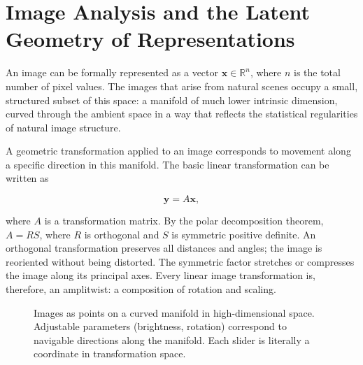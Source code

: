 \documentclass[11pt, a4paper]{article}
\theoremstyle{plain}
\theoremstyle{definition}
\theoremstyle{remark}
\begin{document}
\section{Image Analysis and the Latent Geometry of Representations}

An image can be formally represented as a vector $\mathbf{x} \in \mathbb{R}^n$,
where $n$ is the total number of pixel values. The images that arise from natural
scenes occupy a small, structured subset of this space: a manifold of much lower
intrinsic dimension, curved through the ambient space in a way that reflects
the statistical regularities of natural image structure.

A geometric transformation applied to an image corresponds to movement along a specific
direction in this manifold. The basic linear transformation can be written as

\begin{equation}
\mathbf{y} = A\mathbf{x},
\label{eq:linear_transform}
\end{equation}

where $A$ is a transformation matrix. By the polar decomposition theorem, $A = RS$,
where $R$ is orthogonal and $S$ is symmetric positive definite. An orthogonal
transformation preserves all distances and angles; the image is reoriented without being
distorted. The symmetric factor stretches or compresses the image along its principal
axes. Every linear image transformation is, therefore, an amplitwist: a composition of
rotation and scaling.

\begin{figure}[h]
\centering
{}
\caption{Images as points on a curved manifold in high-dimensional space.
Adjustable parameters (brightness, rotation) correspond to navigable directions
along the manifold. Each slider is literally a coordinate in transformation space.}
\end{figure}
\end{document}
